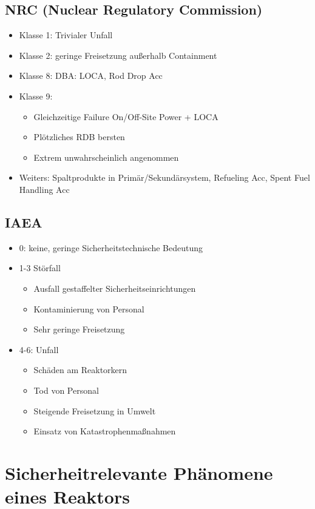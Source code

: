 \documentclass[12pt]{article}
\begin{document}
\subsection{NRC (Nuclear Regulatory Commission)}
\begin{itemize}
  \item Klasse 1: Trivialer Unfall
  \item Klasse 2: geringe Freisetzung außerhalb Containment
  \item Klasse 8: DBA: LOCA, Rod Drop Acc
  \item Klasse 9:
  \begin{itemize}
    \item Gleichzeitige Failure On/Off-Site Power + LOCA
    \item Plötzliches RDB bersten
    \item Extrem unwahrscheinlich angenommen
  \end{itemize}
  \item Weiters: Spaltprodukte in Primär/Sekundärsystem, Refueling Acc, Spent Fuel Handling Acc
\end{itemize}

\subsection{IAEA}
\begin{itemize}
  \item 0: keine, geringe Sicherheitstechnische Bedeutung
  \item 1-3 Störfall
  \begin{itemize}
    \item Ausfall gestaffelter Sicherheitseinrichtungen
    \item Kontaminierung von Personal
    \item Sehr geringe Freisetzung
  \end{itemize}
  \item 4-6: Unfall
  \begin{itemize}
    \item Schäden am Reaktorkern
    \item Tod von Personal
    \item Steigende Freisetzung in Umwelt
    \item Einsatz von Katastrophenmaßnahmen
  \end{itemize}
\end{itemize}

\section{Sicherheitrelevante Phänomene eines Reaktors}
\end{document}

